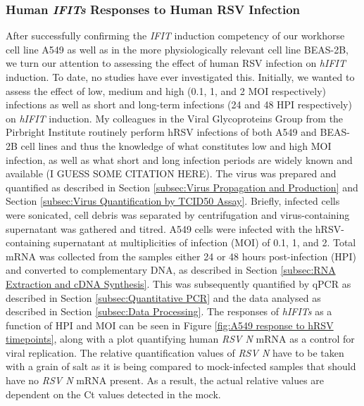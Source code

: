 \subsubsection{Human \textit{IFITs} Responses to Human RSV Infection} \label{Human \textit{IFITs} Responses to Human RSV}
After successfully confirming the \textit{IFIT} induction competency of our workhorse cell line A549 as well as in the more physiologically relevant cell line BEAS-2B, we turn our attention to assessing the effect of human RSV infection on \textit{hIFIT} induction. To date, no studies have ever investigated this. Initially, we wanted to assess the effect of low, medium and high (0.1, 1, and 2 MOI respectively) infections as well as short and long-term infections (24 and 48 HPI respectively) on \textit{hIFIT} induction. My colleagues in the Viral Glycoproteins Group from the Pirbright Institute routinely perform hRSV infections of both A549 and BEAS-2B cell lines and thus the knowledge of what constitutes low and high MOI infection, as well as what short and long infection periods are widely known and available (I GUESS SOME CITATION HERE).  The virus was prepared and quantified as described in Section \ref{subsec:Virus Propagation and Production} and Section \ref{subsec:Virus Quantification by TCID50 Assay}. Briefly, infected cells were sonicated, cell debris was separated by centrifugation and virus-containing supernatant was gathered and titred. A549 cells were infected with the hRSV-containing supernatant at multiplicities of infection (MOI) of 0.1, 1,  and 2. Total mRNA was collected from the samples either 24 or 48 hours post-infection (HPI) and converted to complementary DNA, as described in Section \ref{subsec:RNA Extraction and cDNA Synthesis}. This was subsequently quantified by qPCR as described in Section \ref{subsec:Quantitative PCR} and the data analysed as described in Section \ref{subsec:Data Processing}. The responses of \textit{hIFITs} as a function of HPI and MOI can be seen in Figure \ref{fig:A549 response to hRSV timepoints}, along with a plot quantifying human \textit{RSV N} mRNA as a control for viral replication. The relative quantification values of \textit{RSV N} have to be taken with a grain of salt as it is being compared to mock-infected samples that should have no \textit{RSV N} mRNA present. As a result, the actual relative values are dependent on the Ct values detected in the mock. 
 


